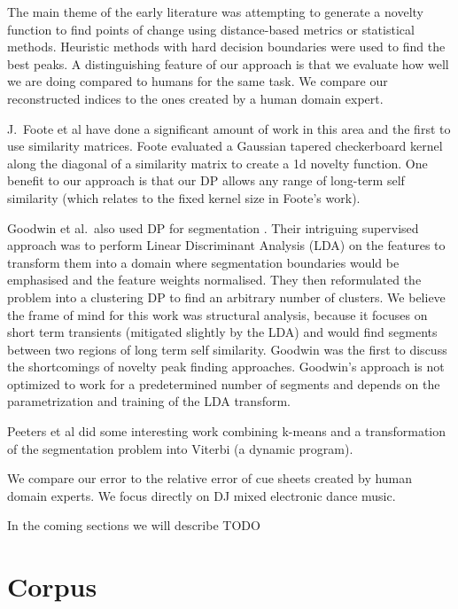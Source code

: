 \documentclass[twocolumn]{article}
\begin{document}
	The main theme of the early literature was attempting to generate a novelty function to find points of change using distance-based metrics or statistical methods. Heuristic methods with hard decision boundaries were used to find the best peaks. A distinguishing feature of our approach is that we evaluate how well we are doing compared to humans for the same task. We compare our reconstructed indices to the ones created by a human domain expert. 
	
	J.\ Foote et al \citep{foote1999visualizing,foote1997similarity,foote2000automatic,foote2003media,foote2001visualizing} have done a significant amount of work in this area and the first to use similarity matrices. Foote evaluated a Gaussian tapered checkerboard kernel along the diagonal of a similarity matrix to create a 1d novelty function. One benefit to our approach is that our DP allows any range of long-term self similarity (which relates to the fixed kernel size in Foote's work).
	
	Goodwin et al.\ also used DP for segmentation \citep{goodwin2003audio,goodwin2004dynamic}. Their intriguing supervised approach was to perform Linear Discriminant Analysis (LDA) on the features to transform them into a domain where segmentation boundaries would be emphasised and the feature weights normalised. They then reformulated the problem into a clustering DP to find an arbitrary number of clusters. We believe the frame of mind for this work was structural analysis, because it focuses on short term transients (mitigated slightly by the LDA) and would find segments between two regions of long term self similarity. Goodwin was the first to discuss the shortcomings of novelty peak finding approaches. Goodwin's approach is not optimized to work for a predetermined number of segments and depends on the parametrization and training of the LDA transform. 
	
	Peeters et al \citep{peeters2002toward,peeters2004deriving} did some interesting work combining k-means and a transformation of the segmentation problem into Viterbi (a dynamic program).
	
	We compare our error to the relative error of cue sheets created by human domain experts. We focus directly on DJ mixed electronic dance music.
	
	In the coming sections we will describe TODO
	
	\section{Corpus}\label{dataset}
	
\end{document}
